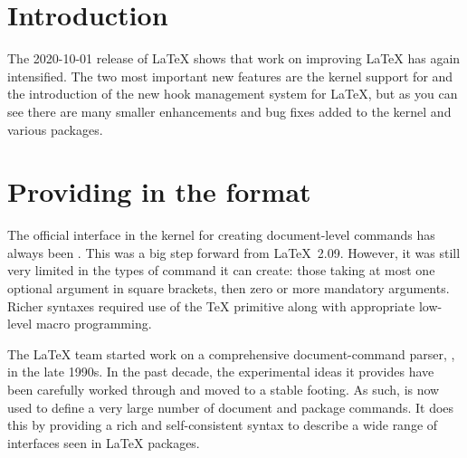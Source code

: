 \documentclass{ltnews}
\providecommand\tubcommand[1]{}
\begin{document}
\tubcommand{\addtolength\textheight{4.2pc}}   %

\maketitle
{ \spaceskip=3.33pt  \tableofcontents}

\setlength{}


\medskip


\section{Introduction}

The 2020-10-01 release of \LaTeX{} shows that work on improving
\LaTeX{} has again intensified. The two most important new features
are the kernel support for  and the introduction of the
new hook management system for \LaTeX{}, but as you can see there are
many smaller enhancements and bug fixes added to the kernel and
various packages.



\section{Providing  in the format}

The official interface in the \LaTeXe{} kernel for creating
document-level commands has always been . This was a
big step forward from \LaTeX~2.09. However, it was still very limited
in the types of command it can create: those taking at most one
optional argument in square brackets, then zero or more mandatory
arguments. Richer syntaxes required use of the \TeX{} 
primitive along with appropriate low-level macro programming.

The \LaTeX{} team started work on a comprehensive document-command
parser, , in the late 1990s. In the past decade, the
experimental ideas it provides have been carefully worked through and
moved to a stable footing. As such,  is now used to define
a very large number of document and package commands. It does this by
providing a rich and self-consistent syntax to describe a wide range of
interfaces seen in \LaTeX{} packages.
\end{document}
